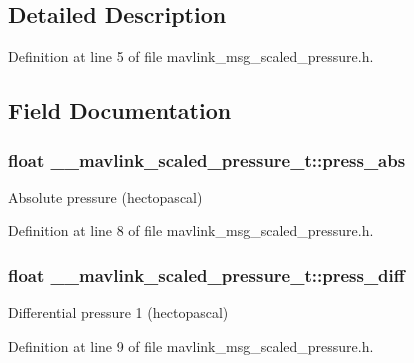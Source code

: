 \subsection{Detailed Description}


Definition at line 5 of file mavlink\-\_\-msg\-\_\-scaled\-\_\-pressure.\-h.



\subsection{Field Documentation}
\hypertarget{struct____mavlink__scaled__pressure__t_a934eb017154df68b78c6448a9c568d56}{
\subsubsection[{press\-\_\-abs}]{\setlength{\rightskip}{0pt plus 5cm}float \-\_\-\-\_\-mavlink\-\_\-scaled\-\_\-pressure\-\_\-t\-::press\-\_\-abs}}\label{struct____mavlink__scaled__pressure__t_a934eb017154df68b78c6448a9c568d56}


Absolute pressure (hectopascal) 



Definition at line 8 of file mavlink\-\_\-msg\-\_\-scaled\-\_\-pressure.\-h.

\hypertarget{struct____mavlink__scaled__pressure__t_a44d34c48be09332608a4d9dc36a809cb}{
\subsubsection[{press\-\_\-diff}]{\setlength{\rightskip}{0pt plus 5cm}float \-\_\-\-\_\-mavlink\-\_\-scaled\-\_\-pressure\-\_\-t\-::press\-\_\-diff}}\label{struct____mavlink__scaled__pressure__t_a44d34c48be09332608a4d9dc36a809cb}


Differential pressure 1 (hectopascal) 



Definition at line 9 of file mavlink\-\_\-msg\-\_\-scaled\-\_\-pressure.\-h.

